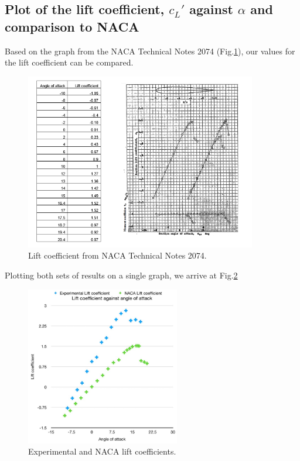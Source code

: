 \documentclass[11pt]{article}
\begin{document}
\subsection*{Plot of the lift coefficient, $c_L'$ against $\alpha$ and comparison to NACA}
Based on the graph from the NACA Technical Notes 2074 (Fig.\ref{nacagraph}), our values for the lift coefficient can be compared.
\begin{figure}[H]
  \centering
  \includegraphics[width = 0.9\textwidth]{./img/diagram20.png}
  \caption{Lift coefficient from NACA Technical Notes 2074.}
  \label{nacagraph}
\end{figure}
Plotting both sets of results on a single graph, we arrive at Fig.\ref{liftcoeffgraphs}
\begin{figure}[H]
  \centering
  \includegraphics[width = 0.6\textwidth]{./img/diagram21.png}
  \caption{Experimental and NACA lift coefficients.}
  \label{liftcoeffgraphs}
\end{figure}
\end{document}

